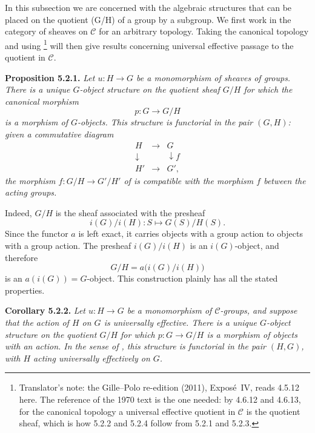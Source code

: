 In this subsection we are concerned with the algebraic structures that can
be placed on the quotient (G/H) of a group by a subgroup. We first work in
the category of sheaves on \(\mathscr C\) for an arbitrary topology. Taking
the canonical topology and using \footnote{Translator's note: the Gille--Polo re-edition (2011),
Expos\'e~IV, reads 4.5.12 here. The reference of the 1970 text is the one
needed: by 4.6.12 and 4.6.13, for the canonical topology a universal effective
quotient in \(\mathscr C\) is the quotient sheaf, which is how 5.2.2 and 5.2.4
follow from 5.2.1 and 5.2.3.} will then give results concerning
universal effective passage to the quotient in \(\mathscr C\).

\medskip
\noindent{}\textbf{Proposition 5.2.1.}
\textit{Let \(u:H\to G\) be a monomorphism of sheaves of groups. There is a
unique \(G\)-object structure on the quotient sheaf \(G/H\) for which the
canonical morphism
\[
  p:G\longrightarrow G/H
\]
is a morphism of \(G\)-objects. This structure is functorial in the pair
\((G,H)\): given a commutative diagram
\[
  \begin{array}{ccc}
    H & \longrightarrow & G \\
    \downarrow && \downarrow\scriptstyle f \\
    H' & \longrightarrow & G',
  \end{array}
\]
the morphism \(f:G/H\to G'/H'\) of  is compatible with the morphism
\(f\) between the acting groups.}

Indeed, \(G/H\) is the sheaf associated with the presheaf
\[
  i(G)/i(H):S\longmapsto G(S)/H(S).
\]
Since the functor \(a\) is left exact, it carries objects with a group
action to objects with a group action. The presheaf \(i(G)/i(H)\) is an
\(i(G)\)-object, and therefore
\[
  G/H=a\bigl(i(G)/i(H)\bigr)
\]
is an \(a(i(G))=G\)-object. This construction plainly has all the stated
properties.

\medskip
\noindent{}\textbf{Corollary 5.2.2.}
\textit{Let \(u:H\to G\) be a monomorphism of \(\mathscr C\)-groups, and
suppose that the action of \(H\) on \(G\) is universally effective. There
is a unique \(G\)-object structure on the quotient
\(G/H\) for which \(p:G\to G/H\) is a
morphism of objects with an action. In the sense of , this structure is functorial in the pair \((H,G)\), with
\(H\) acting universally effectively on \(G\).}


